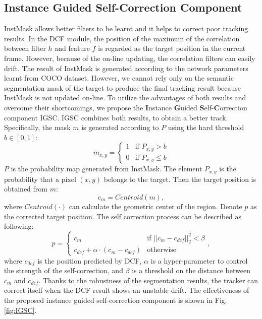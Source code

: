 \subsection{Instance Guided Self-Correction Component} \label{sec:cog}
InstMask allows better filters to be learnt and it helps to correct poor tracking results.
In the DCF module, the position of the maximum of the correlation between filter $h$ and feature $f$ is regarded as the target position in the current frame. However, because of the on-line updating, the correlation filters can easily drift.
The result of InstMask is generated according to the network parameters learnt from COCO dataset. However, we cannot rely only on the semantic segmentation mask of the target to produce the final tracking result because InstMask is not updated on-line.
To utilize the advantages of both results and overcome their shortcomings, we propose the \textbf{I}nstance \textbf{G}uided \textbf{S}elf-\textbf{C}orrection component IGSC. IGSC combines both results, to obtain a better track. Specifically, the mask $m$ is generated according to $P$ using the hard threshold $b \in [0, 1] $:
\begin{equation}
m_{x,y} = \left\{ \begin{array}{ll}
 1 & \textrm{if $P_{x,y} > b$}\\
 0 & \textrm{if $P_{x,y} \le b$}
 \end{array} \right.
\end{equation}
$P$ is the probability map generated from InstMask. The element $P_{x,y}$ is the probability that a pixel $(x,y)$ belongs to the target.
Then the target position is obtained from $m$:
\begin{equation}
c_{m} = Centroid(m),
\end{equation}
where $Centroid(\mathord{\cdot})$ can calculate the geometric center of the region.
Denote $p$ as the corrected target position.
The self correction process can be described as following:
\begin{equation}
p = \left\{ \begin{array}{ll}
 c_{m} & \textrm{if $||c_{m}-c_{dcf}||_2^2 < \beta$}\\
 c_{dcf} + \alpha \cdot (c_{m}-c_{dcf}) & \textrm{otherwise}
 \end{array} \right.,
\end{equation}
where $c_{dcf}$ is the position predicted by DCF, $\alpha$ is a hyper-parameter to control the strength of the self-correction, and $\beta$ is a threshold on the distance between $c_{m}$ and $c_{dcf}$.
Thanks to the robustness of the segmentation results, the tracker can correct itself when the DCF result shows an unstable drift. The effectiveness of the proposed instance guided self-correction component is shown in Fig. \ref{fig:IGSC}.

